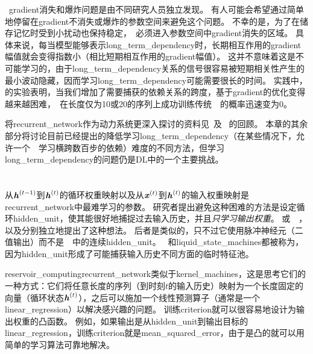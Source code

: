 ~\gls{gradient}消失和爆炸问题是由不同研究人员独立发现\citep{Hochreiter91-small,Bengio_icnn93,Bengio1994ITNN}。
有人可能会希望通过简单地停留在\gls{gradient}不消失或爆炸的参数空间来避免这个问题。
不幸的是，为了在储存记忆时受到小扰动也保持稳定，~必须进入参数空间中\gls{gradient}消失的区域\citep{Bengio_icnn93,Bengio1994ITNN}。
具体来说，每当模型能够表示\gls{long_term_dependency}时，长期相互作用的\gls{gradient}幅值就会变得指数小（相比短期相互作用的\gls{gradient}幅值）。
这并不意味着这是不可能学习的，由于\gls{long_term_dependency}关系的信号很容易被短期相关性产生的最小波动隐藏，因而学习\gls{long_term_dependency}可能需要很长的时间。
实践中，\cite{Bengio1994ITNN}的实验表明，当我们增加了需要捕获的依赖关系的跨度，基于\gls{gradient}的优化变得越来越困难，~在长度仅为10或20的序列上成功训练传统~~的概率迅速变为0。

将\gls{recurrent_network}作为动力系统更深入探讨的资料见~\cite{Doya93,Bengio1994ITNN,Siegelmann+Sontag-1995}及~
\cite{Pascanu-et-al-ICML2013}的回顾。
本章的其余部分将讨论目前已经提出的降低学习\gls{long_term_dependency}（在某些情况下，允许一个~~学习横跨数百步的依赖）难度的不同方法，但学习\gls{long_term_dependency}的问题仍是\gls{DL}中的一个主要挑战。


\section{}
\label{sec:echo_state_networks}
从$\boldsymbol{\mathit{h}}^{(t-1)}$到$\boldsymbol{\mathit{h}}^{(t)}$的循环权重映射以及从$\boldsymbol{\mathit{x}}^{(t)}$到$\boldsymbol{\mathit{h}}^{(t)}$的输入权重映射是\gls{recurrent_network}中最难学习的参数。
研究者\citep{Jaeger-NIPS2002,Maass-et-al-2002,Jaeger+Haas-2004,Jaeger-2007}提出避免这种困难的方法是设定循环\gls{hidden_unit}，使其能很好地捕捉过去输入历史，并且\emph{只学习输出权重}。
或~~\citep{Jaeger+Haas-2004,Jaeger-2007}，以及\citep{Maass-et-al-2002}分别独立地提出了这种想法。
后者是类似的，只不过它使用脉冲神经元（二值输出）而不是~~中的连续\gls{hidden_unit}。
~和\gls{liquid_state_machines}都被称为\citep{Lukosevicius+Jaeger-2009}，因为\gls{hidden_unit}形成了可能捕获输入历史不同方面的临时特征池。


\gls{reservoir_computing}\gls{recurrent_network}类似于\gls{kernel_machines}，这是思考它们的一种方式：它们将任意长度的序列（到时刻$t$的输入历史）映射为一个长度固定的向量（循环状态$\boldsymbol{\mathit{h}}^{(t)}$），之后可以施加一个线性预测算子（通常是一个\gls{linear_regression}）以解决感兴趣的问题。
训练\gls{criterion}就可以很容易地设计为输出权重的凸函数。
例如，如果输出是从\gls{hidden_unit}到输出目标的\gls{linear_regression}，训练\gls{criterion}就是\gls{mean_squared_error}，由于是凸的就可以用简单的学习算法可靠地解决\citep{Jaeger-NIPS2002}。

